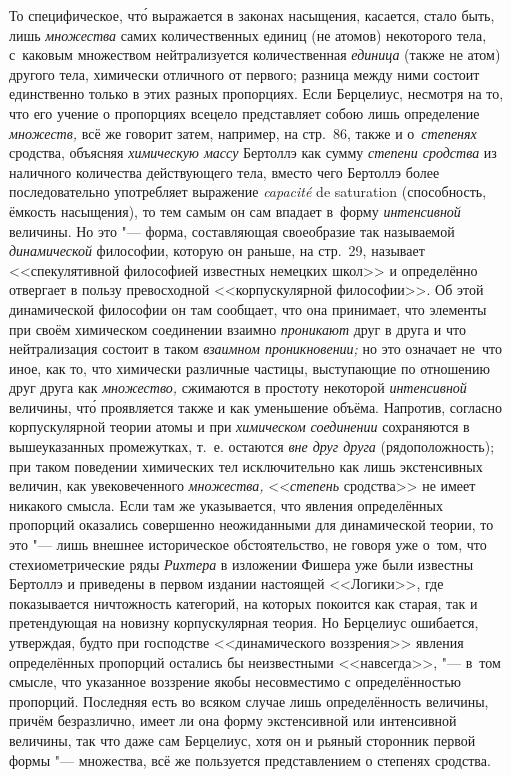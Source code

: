 То специфическое, чт\'{о} выражается в законах насыщения, касается, стало быть,
лишь {\em множества} самих количественных единиц (не атомов) некоторого тела,
с~каковым множеством нейтрализуется количественная {\em единица} (также не
атом) другого тела, химически отличного от первого; разница между ними состоит
единственно только в этих разных пропорциях. Если Берцелиус, несмотря на то,
что его учение о пропорциях всецело представляет собою лишь определение
{\em множеств,} всё же говорит затем, например, на стр.~86, также и
о~{\em степенях} сродства, объясняя {\em химическую массу} Бертоллэ как сумму
{\em степени сродства} из наличного количества действующего тела, вместо чего
Бертоллэ более последовательно употребляет выражение {\em capa\-cité} de
satura\-tion (способность, ёмкость насыщения), то тем самым он сам впадает
в~форму {\em интенсивной} величины. Но это "--- форма, составляющая своеобразие
так называемой {\em динамической} философии, которую он раньше, на стр.~29,
называет <<спекулятивной философией известных немецких школ>> и определённо
отвергает в пользу превосходной <<корпускулярной философии>>. Об этой
динамической философии он там сообщает, что она принимает, что элементы при
своём химическом соединении взаимно {\em проникают} друг в друга и что
нейтрализация состоит в таком {\em взаимном проникновении;} но это означает
не~что иное, как то, что химически различные частицы, выступающие по отношению
друг друга как {\em множество,} сжимаются в простоту некоторой
{\em интенсивной} величины, чт\'{о} проявляется также и как уменьшение объёма.
Напротив, согласно корпускулярной теории атомы и при
{\em химическом соединении} сохраняются в вышеуказанных промежутках, т.~е.
остаются {\em вне друг друга} (рядоположность); при таком поведении химических
тел исключительно как лишь экстенсивных величин, как увековеченного
{\em множества,} <<{\em степень} сродства>> не имеет никакого смысла. Если там
же указывается, что явления определённых пропорций оказались совершенно
неожиданными для динамической теории, то это "--- лишь внешнее историческое
обстоятельство, не говоря уже о~том, что стехиометрические ряды {\em Рихтера}
в изложении Фишера уже были известны Бертоллэ и приведены в первом издании
настоящей <<Логики>>, где показывается ничтожность категорий, на которых
покоится как старая, так и претендующая на новизну корпускулярная теория.
Но Берцелиус ошибается, утверждая, будто при господстве <<динамического
воззрения>> явления определённых пропорций остались бы неизвестными
<<навсегда>>, "--- в~том смысле, что указанное воззрение якобы несовместимо с
определённостью пропорций. Последняя есть во всяком случае лишь определённость
величины, причём безразлично, имеет ли она форму экстенсивной или интенсивной
величины, так что даже сам Берцелиус, хотя он и рьяный сторонник первой формы
"--- множества, всё же пользуется представлением о степенях сродства.

